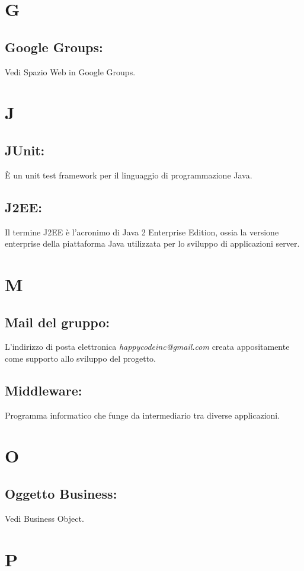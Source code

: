 \chapter{G}
\section{Google Groups:}
Vedi Spazio Web in Google Groups.

\chapter{J}
\section{JUnit:}
\`E un unit test framework per il linguaggio di programmazione Java.
\section{J2EE:}
Il termine J2EE \`e l'acronimo di Java 2 Enterprise Edition, ossia la versione enterprise della piattaforma Java utilizzata per lo sviluppo di applicazioni server.

\chapter{M}
\section{Mail del gruppo:}
L'indirizzo di posta elettronica \textit{happycodeinc@gmail.com} creata appositamente come supporto allo sviluppo del progetto.
\section{Middleware:}
Programma informatico che funge da intermediario tra diverse applicazioni.

\chapter{O}
\section{Oggetto Business:}
Vedi Business Object.

\chapter{P}
